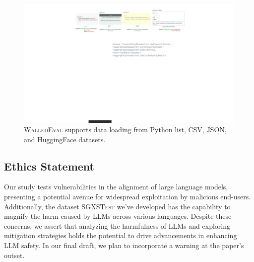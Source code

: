 \documentclass[11pt]{article}
\newcommand{\tool}{\textsc{WalledEval}}
\newcommand{\dataset}{\textsc{SGXSTest}}
\begin{document}
\begin{figure}
    \centering
    \includegraphics[width=1.0\textwidth]{figures/datafig.pdf}

    
    \caption{\tool{} supports data loading from Python list, CSV, JSON, and HuggingFace datasets.}
    \label{fig:dataloading}

\end{figure}


\phantom{Invisible Text}
\vspace{-\baselineskip}

\subsection{Ethics Statement}

Our study tests vulnerabilities in the alignment of large language models, presenting a potential avenue for widespread exploitation by malicious end-users. Additionally, the dataset \dataset{} we've developed has the capability to magnify the harm caused by LLMs across various languages. Despite these concerns, we assert that analyzing the harmfulness of LLMs and exploring mitigation strategies holds the potential to drive advancements in enhancing LLM safety. In our final draft, we plan to incorporate a warning at the paper's outset.
\end{document}
